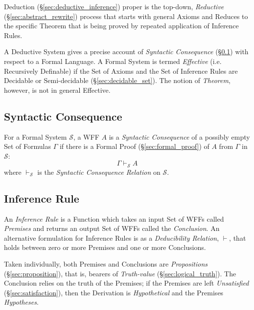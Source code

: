 Deduction (\S\ref{sec:deductive_inference}) proper is the top-down,
\emph{Reductive} (\S\ref{sec:abstract_rewrite}) process that starts
with general Axioms and Reduces to the specific Theorem that is being
proved by repeated application of Inference Rules.

A Deductive System gives a precise account of \emph{Syntactic
  Consequence} (\S\ref{sec:syntactic_consequence}) with respect to a
Formal Language. A Formal System is termed \emph{Effective} (i.e.
Recursively Definable) if the Set of Axioms and the Set of Inference
Rules are Decidable or Semi-decidable (\S\ref{sec:decidable_set}). The
notion of \emph{Theorem}, however, is not in general Effective.



\subsection{Syntactic Consequence}\label{sec:syntactic_consequence}

For a Formal System $\mathcal{S}$, a WFF $A$ is a \emph{Syntactic
  Consequence} of a possibly empty Set of Formulas $\Gamma$ if there
is a Formal Proof (\S\ref{sec:formal_proof}) of $A$ from $\Gamma$ in
$\mathcal{S}$:
\[
    \Gamma \vdash_{\mathcal{S}} A
\]
where $\vdash_{\mathcal{S}}$ is the \emph{Syntactic Consequence
  Relation} on $\mathcal{S}$.



\subsection{Inference Rule} \label{sec:inference_rule}

An \emph{Inference Rule} is a Function which takes an input Set of
WFFs called \emph{Premises} and returns an output Set of WFFs called
the \emph{Conclusion}. An alternative formulation for Inference Rules
is as a \emph{Deducibility Relation}, $\vdash$, that holds between
zero or more Premises and one or more Conclusions.

Taken individually, both Premises and Conclusions are
\emph{Propositions} (\S\ref{sec:proposition}), that is, bearers of
\emph{Truth-value} (\S\ref{sec:logical_truth}). The Conclusion relies
on the truth of the Premises; if the Premises are left
\emph{Unsatisfied} (\S\ref{sec:satisfaction}), then the Derivation is
\emph{Hypothetical} and the Premises \emph{Hypotheses}.

